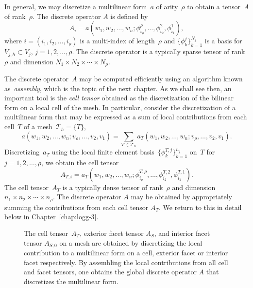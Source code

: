 In general, we may discretize a multilinear form~$a$ of arity~$\rho$
to obtain a tensor~$A$ of rank~$\rho$. The discrete operator $A$ is
defined by
\begin{equation}
  A_i = a(w_1, w_2, \ldots, w_n;
  \phi^{\rho}_{i_{\rho}}, \ldots, \phi^2_{i_2}, \phi^1_{i_1}),
\end{equation}
where $i = (i_1, i_2, \ldots, i_{\rho})$ is a multi-index of
length~$\rho$ and $\{\phi^j_k\}_{k=1}^{N_j}$ is a basis for $V_{j,h}
\subset V_j$, $j = 1,2,\ldots,\rho$. The discrete operator is a
typically sparse tensor of rank~$\rho$ and dimension $N_1 \times N_2
\times \cdots \times N_{\rho}$.

The discrete operator~$A$ may be computed efficiently using an
algorithm known as~\emph{assembly}, which is the topic of the next
chapter. As we shall see then, an important tool is the \emph{cell
  tensor} obtained as the discretization of the bilinear form on a
local cell of the mesh. In particular, consider the discretization of
a multilinear form that may be expressed as a sum of local
contributions from each cell~$T$ of a mesh~$\mathcal{T}_h = \{T\}$,
\begin{equation}
  a(w_1, w_2, \ldots, w_n; v_{\rho}, \ldots, v_2, v_1)
  = \sum_{T\in\mathcal{T}_h}
  a_T(w_1, w_2, \ldots, w_n; v_{\rho}, \ldots, v_2, v_1).
\end{equation}
Discretizing~$a_T$ using the local finite element
basis~$\{\phi^{T,j}_k\}_{k=1}^{n_j}$ on~$T$ for $j = 1,
2, \ldots, \rho$, we obtain the cell tensor
\begin{equation} \label{eq:kirby-5:celltensor}
  A_{T,i}
  = a_T(w_1, w_2, \ldots, w_n;
        \phi^{T,\rho}_{i_{\rho}}, \ldots, \phi^{T,2}_{i_2}, \phi^{T,1}_{i_1}).
\end{equation}
The cell tensor~$A_T$ is a typically dense tensor of rank~$\rho$ and
dimension $n_1 \times n_2 \times \cdots \times n_{\rho}$. The discrete
operator $A$ may be obtained by appropriately summing the
contributions from each cell tensor $A_T$. We return to this in detail
below in Chapter~\ref{chap:logg-3}.

\begin{figure}
  \centering
  \caption{The cell tensor~$A_T$, exterior facet tensor $A_S$, and
    interior facet tensor $A_{S,0}$ on a mesh are obtained by
    discretizing the local contribution to a multilinear form on a
    cell, exterior facet or interior facet respectively. By
    assembling the local contributions from all cell and facet
    tensors, one obtains the global discrete operator $A$ that
    discretizes the multilinear form.}
  \label{fig:kirby-5:tensors}
\end{figure}

